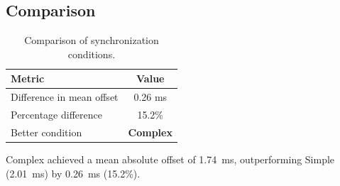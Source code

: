 \subsection*{Comparison}

\begin{table}[h!]
\centering
\begin{tabular}{|l|c|}
\hline
Metric & Value \\
\hline
Difference in mean offset & 0.26 ms \\
Percentage difference & 15.2\% \\
Better condition & \textbf{Complex} \\
\hline
\end{tabular}
\caption{Comparison of synchronization conditions.}
\label{tab:sync_comparison}
\end{table}

Complex achieved a mean absolute offset of 1.74~ms, outperforming Simple (2.01~ms) by 0.26~ms (15.2\%).
